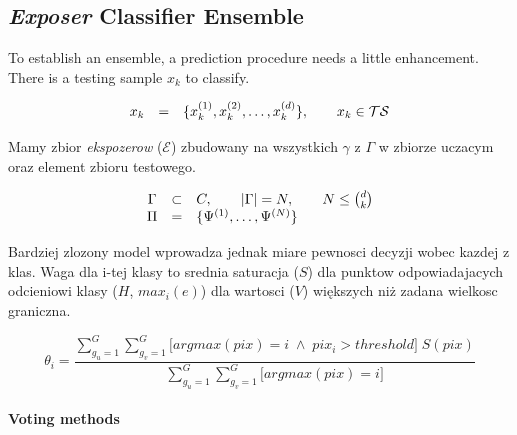 \documentclass[]{article}
\begin{document}
\subsection{\emph{Exposer} Classifier Ensemble}
\label{exposerclassifierensemble}

To establish an ensemble, a prediction procedure needs a little enhancement. There is a testing sample $x_k$ to classify.

\begin{equation}
	\begin{array}[b]{cll}
		x_k &=&\{x_k^{(1)}, x_k^{(2)}, \ldots, x_k^{(d)}\},\quad\quad x_k \in \mathcal{TS}
	\end{array}
\end{equation}

Mamy zbior \emph{ekspozerow} ($\mathcal{E}$) zbudowany na wszystkich $\gamma$ z $\Gamma$ w zbiorze uczacym oraz element zbioru testowego.

\begin{equation}
	\begin{array}[b]{cll}
		\Gamma & \subset & C,\quad\quad |\Gamma| = N,\quad\quad N \leq {d \choose k}\\
		\Pi &=& \{\Psi^{(1)},\ldots,\Psi^{(N)}\}
	\end{array}
\end{equation}

Bardziej zlozony model wprowadza jednak miare pewnosci decyzji wobec kazdej z klas. Waga dla i-tej klasy to srednia saturacja ($S$) dla punktow odpowiadajacych odcieniowi klasy ($H$, $max_i(e)$) dla wartosci ($V$) większych niż zadana wielkosc graniczna. 

\begin{equation}
	\theta _i = \frac{\sum_{g_u=1}^{G}\sum_{g_v=1}^{G}\Big[ argmax(pix) = i \;\wedge\; pix_i > threshold\Big]\;S(pix)}{\sum_{g_u=1}^{G}\sum_{g_v=1}^{G} \Big[ argmax(pix) = i\Big]} 
\end{equation}

\paragraph{Voting methods}
\end{document}
